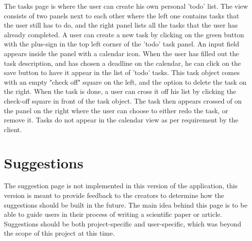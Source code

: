 The tasks page is where the user can create his own personal 'todo' list. The view consists of two
panels next to each other where the left one contains tasks that the user still has to do,
and the right panel lists all the tasks that the user has already completed. A user can create
a new task by clicking on the green button with the plus-sign in the top left corner of the 'todo' task
panel. An input field appears inside the panel with a calendar icon. When the user has filled out
the task description, and has chosen a deadline on the calendar, he can click on the save button to have
it appear in the list of 'todo' tasks. This task object comes with an empty "check off" square on the left,
and the option to delete the task on the right. When the task is done, a user can cross it off his list by
clicking the check-off square in front of the task object. The task then appears crossed of on the panel on
the right where the user can choose to either redo the task, or remove it. Tasks do not appear in the calendar
view as per requirement by the client.

\section{Suggestions}

The suggestion page is not implemented in this version of the application, this version is meant to provide feedback to the creators
to determine how the suggestions should be built in the future. The main idea behind this page is to be able to guide users in their
process of writing a scientific paper or article. Suggestions should be both project-specific and user-specific, which was beyond
the scope of this project at this time.